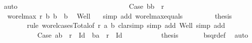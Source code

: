 \begin{isabellebody}
\ auto\isanewline
\ \ \ \ \ \ \ \ \ \isamarkupfalse%
\isanewline
\ \ \ \ \ \ \ \isamarkupfalse%
\isanewline
\ \ \ \ \ \isamarkupfalse%
\isanewline
\ \ \ \ \ \ \ \isamarkupfalse%
\ Case{}{}{\isacharcolon}{\kern0pt}\ {\isachardoublequoteopen}{\isacharparenleft}{\kern0pt}b{}{\isacharcomma}{\kern0pt}b{}{\isacharparenright}{\kern0pt}\ {\isasymin}\ r{\isachardoublequoteclose}\isanewline
\ \ \ \ \ \ \ \isamarkupfalse%
\ {}{\isacharcolon}{\kern0pt}\ {\isachardoublequoteopen}wo{\isacharunderscore}{\kern0pt}rel{\isachardot}{\kern0pt}max{}\ r\ b{}\ b{}\ {\isacharequal}{\kern0pt}\ b{}{\isachardoublequoteclose}\ \isamarkupfalse%
\ Well\ {}\ \isamarkupfalse%
\ {\isacharparenleft}{\kern0pt}simp\ add{\isacharcolon}{\kern0pt}\ wo{\isacharunderscore}{\kern0pt}rel{\isachardot}{\kern0pt}max{}{\isacharunderscore}{\kern0pt}equals{}{\isacharparenright}{\kern0pt}\isanewline
\ \ \ \ \ \ \ \isamarkupfalse%
\ {\isacharquery}{\kern0pt}thesis\isanewline
\ \ \ \ \ \ \ \isamarkupfalse%
{\isacharparenleft}{\kern0pt}rule\ wo{\isacharunderscore}{\kern0pt}rel{\isachardot}{\kern0pt}cases{\isacharunderscore}{\kern0pt}Total{}{\isacharbrackleft}{\kern0pt}of\ r\ a{}\ b{}{\isacharbrackright}{\kern0pt}{\isacharcomma}{\kern0pt}\ clarsimp\ simp\ add{\isacharcolon}{\kern0pt}\ Well{\isacharcomma}{\kern0pt}\ simp\ add{\isacharcolon}{\kern0pt}\ {}{\isacharparenright}{\kern0pt}\isanewline
\ \ \ \ \ \ \ \ \ \isamarkupfalse%
\ Case{}{}{}{\isacharcolon}{\kern0pt}\ {\isachardoublequoteopen}{\isacharparenleft}{\kern0pt}a{}{\isacharcomma}{\kern0pt}b{}{\isacharparenright}{\kern0pt}\ {\isasymin}\ r\ {\isacharminus}{\kern0pt}\ Id\ {\isasymor}\ {\isacharparenleft}{\kern0pt}b{}{\isacharcomma}{\kern0pt}a{}{\isacharparenright}{\kern0pt}\ {\isasymin}\ r\ {\isacharminus}{\kern0pt}\ Id{\isachardoublequoteclose}\isanewline
\ \ \ \ \ \ \ \ \ \isamarkupfalse%
\ {\isacharquery}{\kern0pt}thesis\ \isamarkupfalse%
\ {}\ {}\ {}\ \isamarkupfalse%
\ bsqr{\isacharunderscore}{\kern0pt}def\ \isamarkupfalse%
\ auto\isanewline
\ \ \ \ \ \ \ \isamarkupfalse%
\isanewline

\end{isabellebody}
